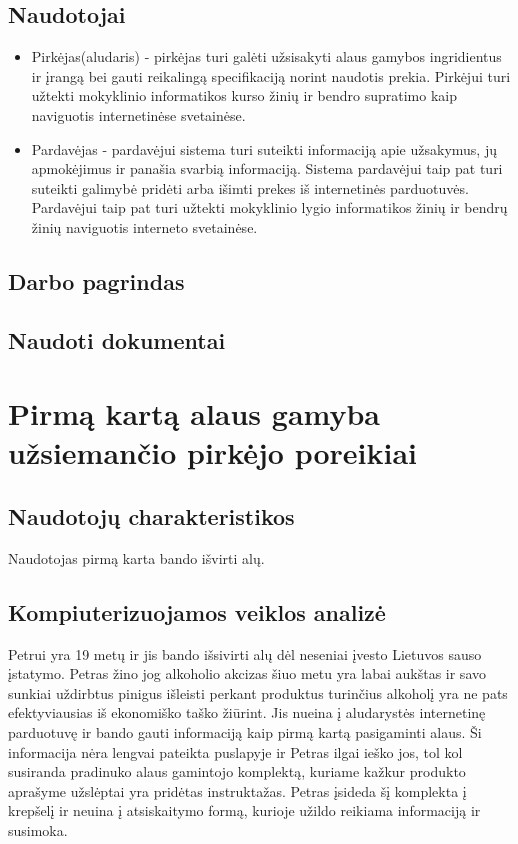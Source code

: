 \documentclass[oneside]{VUMIFPSkursinis}
\begin{document}
	\subsection{Naudotojai}
		\begin{itemize}
			\item{Pirkėjas(aludaris) - pirkėjas turi galėti užsisakyti alaus gamybos ingridientus ir įrangą bei gauti reikalingą specifikaciją norint naudotis prekia. 
				Pirkėjui turi užtekti mokyklinio informatikos kurso žinių ir bendro supratimo kaip naviguotis internetinėse svetainėse.}
			\item{Pardavėjas - pardavėjui sistema turi suteikti informaciją apie užsakymus, jų apmokėjimus ir panašia svarbią informaciją. 
				Sistema pardavėjui taip pat turi suteikti galimybė pridėti arba išimti prekes iš internetinės parduotuvės. 
				Pardavėjui taip pat turi užtekti mokyklinio lygio informatikos žinių ir bendrų žinių naviguotis interneto svetainėse.}
		\end{itemize}
	\subsection{Darbo pagrindas}
	\subsection{Naudoti dokumentai}

\section{Pirmą kartą alaus gamyba užsiemančio pirkėjo poreikiai}
	\subsection{Naudotojų charakteristikos}
		Naudotojas pirmą karta bando išvirti alų.
	\subsection{Kompiuterizuojamos veiklos analizė}
		Petrui yra 19 metų ir jis bando išsivirti alų dėl neseniai įvesto Lietuvos sauso įstatymo.
		Petras žino jog alkoholio akcizas šiuo metu yra labai aukštas ir savo sunkiai uždirbtus pinigus išleisti perkant produktus turinčius alkoholį yra ne pats efektyviausias iš ekonomiško taško žiūrint.
		Jis nueina į aludarystės internetinę parduotuvę ir bando gauti informaciją kaip pirmą kartą pasigaminti alaus.
		Ši informacija nėra lengvai pateikta puslapyje ir Petras ilgai ieško jos, tol kol susiranda pradinuko alaus gamintojo komplektą, kuriame kažkur produkto aprašyme užslėptai yra pridėtas instruktažas.
		Petras įsideda šį komplekta į krepšelį ir neuina į atsiskaitymo formą, kurioje užildo reikiama informaciją ir susimoka.
\end{document}
